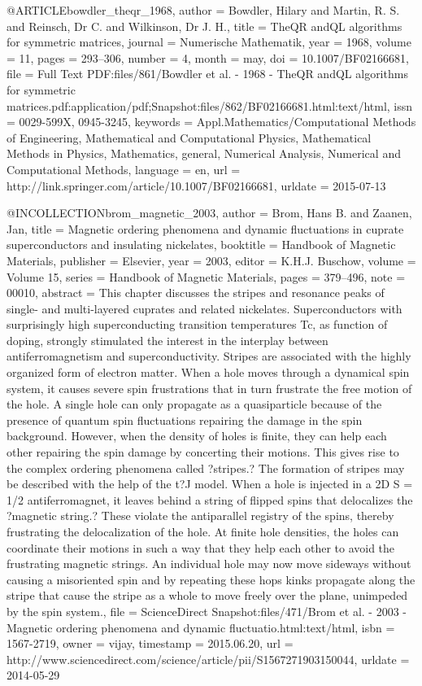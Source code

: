 @ARTICLE{bowdler_theqr_1968,
  author = {Bowdler, Hilary and Martin, R. S. and Reinsch, Dr C. and Wilkinson,
	Dr J. H.},
  title = {{TheQR} {andQL} algorithms for symmetric matrices},
  journal = {Numerische Mathematik},
  year = {1968},
  volume = {11},
  pages = {293--306},
  number = {4},
  month = may,
  doi = {10.1007/BF02166681},
  file = {Full Text PDF:files/861/Bowdler et al. - 1968 - TheQR andQL algorithms for symmetric matrices.pdf:application/pdf;Snapshot:files/862/BF02166681.html:text/html},
  issn = {0029-599X, 0945-3245},
  keywords = {Appl.Mathematics/Computational Methods of Engineering, Mathematical
	and Computational Physics, Mathematical Methods in Physics, Mathematics,
	general, Numerical Analysis, Numerical and Computational Methods},
  language = {en},
  url = {http://link.springer.com/article/10.1007/BF02166681},
  urldate = {2015-07-13}
}

@INCOLLECTION{brom_magnetic_2003,
  author = {Brom, Hans B. and Zaanen, Jan},
  title = {Magnetic ordering phenomena and dynamic fluctuations in cuprate superconductors
	and insulating nickelates},
  booktitle = {Handbook of {Magnetic} {Materials}},
  publisher = {Elsevier},
  year = {2003},
  editor = {{K.H.J. Buschow}},
  volume = {Volume 15},
  series = {Handbook of {Magnetic} {Materials}},
  pages = {379--496},
  note = {00010},
  abstract = {This chapter discusses the stripes and resonance peaks of single-
	and multi-layered cuprates and related nickelates. Superconductors
	with surprisingly high superconducting transition temperatures Tc,
	as function of doping, strongly stimulated the interest in the interplay
	between antiferromagnetism and superconductivity. Stripes are associated
	with the highly organized form of electron matter. When a hole moves
	through a dynamical spin system, it causes severe spin frustrations
	that in turn frustrate the free motion of the hole. A single hole
	can only propagate as a quasiparticle because of the presence of
	quantum spin fluctuations repairing the damage in the spin background.
	However, when the density of holes is finite, they can help each
	other repairing the spin damage by concerting their motions. This
	gives rise to the complex ordering phenomena called ?stripes.? The
	formation of stripes may be described with the help of the t?J model.
	When a hole is injected in a 2D S = 1/2 antiferromagnet, it leaves
	behind a string of flipped spins that delocalizes the ?magnetic string.?
	These violate the antiparallel registry of the spins, thereby frustrating
	the delocalization of the hole. At finite hole densities, the holes
	can coordinate their motions in such a way that they help each other
	to avoid the frustrating magnetic strings. An individual hole may
	now move sideways without causing a misoriented spin and by repeating
	these hops kinks propagate along the stripe that cause the stripe
	as a whole to move freely over the plane, unimpeded by the spin system.},
  file = {ScienceDirect Snapshot:files/471/Brom et al. - 2003 - Magnetic ordering phenomena and dynamic fluctuatio.html:text/html},
  isbn = {1567-2719},
  owner = {vijay},
  timestamp = {2015.06.20},
  url = {http://www.sciencedirect.com/science/article/pii/S1567271903150044},
  urldate = {2014-05-29}
}

